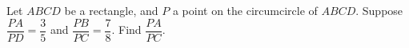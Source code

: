 Let $ABCD$ be a rectangle, and $P$ a point on the circumcircle of $ABCD$. Suppose $\dfrac{PA}{PD}=\dfrac{3}{5}$ and $\dfrac{PB}{PC}=\dfrac{7}{8}$. Find $\dfrac{PA}{PC}$.

